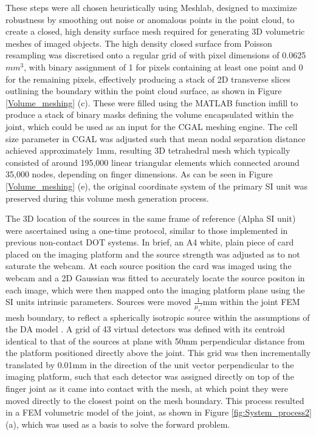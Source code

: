 \documentclass[twoside]{bhamthesis}
\theoremstyle{definition}
\begin{document}
These steps were all chosen heuristically using Meshlab, designed to maximize robustness by smoothing out noise or anomalous points in the point cloud, to create a closed, high density surface mesh required for generating 3D volumetric meshes of imaged objects.
The high density closed surface from Poisson resampling was discretised onto a regular grid of with pixel dimensions of 0.0625$mm^3$, with binary assignment of 1 for pixels containing at least one point and 0 for the remaining pixels, effectively producing a stack of 2D transverse slices outlining the boundary within the point cloud surface, as shown in Figure 
\ref{Volume_meshing} (c). These were filled using the MATLAB function imfill to produce a stack of binary masks defining the volume encapsulated within the joint, which could be used as an input for the CGAL meshing engine. The cell size parameter in CGAL was adjusted such that mean nodal separation distance achieved approximately 1mm, resulting 3D tetrahedral mesh which typically consisted of around 195,000 linear triangular elements which connected around 35,000 nodes, depending on finger dimensions. As can be seen in Figure \ref{Volume_meshing} (e), the original coordinate system of the primary SI unit was preserved during this volume mesh generation process. 

The 3D location of the sources in the same frame of reference (Alpha SI unit) were ascertained using a one-time protocol, similar to those implemented in previous non-contact DOT systems\cite{guggenheim2014multi, taylor2018quantitative}. In brief, an A4 white, plain piece of card placed on the imaging platform and the source strength was adjusted as to not saturate the webcam. At each source position the card was imaged using the webcam and a 2D Gaussian was fitted to accurately locate the source positon in each image, which were then mapped onto the imaging platform plane using the SI units intrinsic parameters. Sources were moved $\frac{1}{\mu_s'}$mm within the joint FEM mesh boundary, to reflect a spherically isotropic source within the assumptions of the DA model \cite{dehghani2009near}. A grid of 43 virtual detectors was defined with its centroid identical to that of the sources at plane with 50mm perpendicular distance from the platform positioned directly above the joint. This grid was then incrementally translated by 0.01mm in the direction of the unit vector perpendicular to the imaging platform, such that each detector was assigned directly on top of the finger joint as it came into contact with the mesh, at which point they were moved directly to the closest point on the mesh boundary. This process resulted in a FEM volumetric model of the joint, as shown in Figure \ref{fig:System_process2} (a), which was used as a basis to solve the forward problem.
\end{document}
